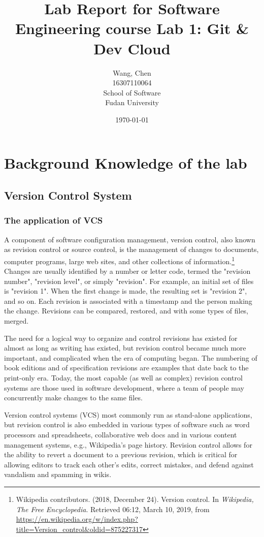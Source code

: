 \documentclass[a4paper]{report}
\title{Lab Report for Software Engineering course \newline
 Lab 1: Git \& Dev Cloud}
\author{Wang, Chen \\ 16307110064 \\ School of Software\\ Fudan University}
\date{\today}
\begin{document}
\maketitle

\tableofcontents

\chapter{Background Knowledge of the lab}
\section{Version Control System}
\subsection{The application of VCS}
\par
A component of software configuration management, version control, also known as revision control or source control, is the management of changes to documents, computer programs, large web sites, and other collections of information.\footnote{Wikipedia contributors. (2018, December 24). Version control. In \emph{Wikipedia, The Free Encyclopedia}. Retrieved 06:12, March 10, 2019, from \url{https://en.wikipedia.org/w/index.php?title=Version_control&oldid=875227317}} Changes are usually identified by a number or letter code, termed the "revision number", "revision level", or simply "revision". For example, an initial set of files is "revision 1". When the first change is made, the resulting set is "revision 2", and so on. Each revision is associated with a timestamp and the person making the change. Revisions can be compared, restored, and with some types of files, merged.

\par
The need for a logical way to organize and control revisions has existed for almost as long as writing has existed, but revision control became much more important, and complicated when the era of computing began. The numbering of book editions and of specification revisions are examples that date back to the print-only era. Today, the most capable (as well as complex) revision control systems are those used in software development, where a team of people may concurrently make changes to the same files.

\par
Version control systems (VCS) most commonly run as stand-alone applications, but revision control is also embedded in various types of software such as word processors and spreadsheets, collaborative web docs and in various content management systems, e.g., Wikipedia's page history. Revision control allows for the ability to revert a document to a previous revision, which is critical for allowing editors to track each other's edits, correct mistakes, and defend against vandalism and spamming in wikis.
\end{document}
